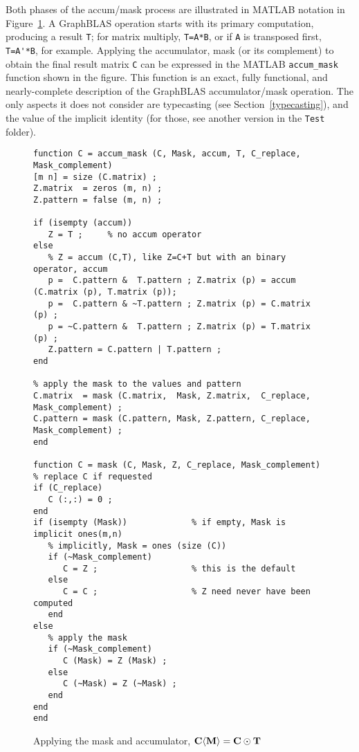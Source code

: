 \documentclass[12pt]{article}
\begin{document}
Both phases of the accum/mask process are illustrated in MATLAB notation in
Figure~\ref{fig_accummask}.  A GraphBLAS operation starts with its primary
computation, producing a result \verb'T'; for matrix multiply, \verb'T=A*B', or
if \verb'A' is transposed first, \verb"T=A'*B", for example.  Applying the
accumulator, mask (or its complement) to obtain the final result matrix
\verb'C' can be expressed in the MATLAB \verb'accum_mask' function shown in the
figure.  This function is an exact, fully functional, and nearly-complete
description of the GraphBLAS accumulator/mask operation.  The only aspects it
does not consider are typecasting (see Section~\ref{typecasting}), and the
value of the implicit identity (for those, see another version in the
\verb'Test' folder).

\begin{figure}
\begin{mdframed}[leftmargin=-0.4in,userdefinedwidth=5.8in]
{\footnotesize
\begin{verbatim}
function C = accum_mask (C, Mask, accum, T, C_replace, Mask_complement)
[m n] = size (C.matrix) ;
Z.matrix  = zeros (m, n) ;
Z.pattern = false (m, n) ;

if (isempty (accum))
   Z = T ;     % no accum operator
else
   % Z = accum (C,T), like Z=C+T but with an binary operator, accum
   p =  C.pattern &  T.pattern ; Z.matrix (p) = accum (C.matrix (p), T.matrix (p));
   p =  C.pattern & ~T.pattern ; Z.matrix (p) = C.matrix (p) ;
   p = ~C.pattern &  T.pattern ; Z.matrix (p) = T.matrix (p) ;
   Z.pattern = C.pattern | T.pattern ;
end

% apply the mask to the values and pattern
C.matrix  = mask (C.matrix,  Mask, Z.matrix,  C_replace, Mask_complement) ;
C.pattern = mask (C.pattern, Mask, Z.pattern, C_replace, Mask_complement) ;
end

function C = mask (C, Mask, Z, C_replace, Mask_complement)
% replace C if requested
if (C_replace)
   C (:,:) = 0 ;
end
if (isempty (Mask))             % if empty, Mask is implicit ones(m,n)
   % implicitly, Mask = ones (size (C))
   if (~Mask_complement)
      C = Z ;                   % this is the default
   else
      C = C ;                   % Z need never have been computed
   end
else
   % apply the mask
   if (~Mask_complement)
      C (Mask) = Z (Mask) ;
   else
      C (~Mask) = Z (~Mask) ;
   end
end
end \end{verbatim} }
\end{mdframed}
\caption{Applying the mask and accumulator, ${\bf C \langle M \rangle = C \odot T}$\label{fig_accummask}}
\end{figure}
\end{document}
